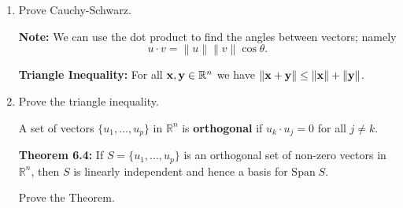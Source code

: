 \documentclass[12pt,letterpaper]{article}
\newcommand{\norm}[1]{\left\lVert#1\right\rVert}
\begin{document}
\begin{enumerate}

\Problem Prove the Theorem.

\vfill

\begin{defn} The set $$W^{\perp} =\{ z \in \mathbb{R}^n: z \cdot w=0 \text{ for all } w \in W\}$$ is called the {\bf orthogonal complement} of $W$.
\end{defn}

\newpage

{\bf Note:} $x \in W^{\perp}$ if and only if $x$ is orthogonal to each vector in a set that spans $W$. Also $W^{\perp}$ is a subspace of $\mathbb{R}^n$.

\vfill

{\bf Theorem 6.3} Let $A$ be an $m\times n$ matrix, then $$(\text{Row}(A))^{\perp} = \text{Null}(A) \text{ and } (\text{Col}(A))^{\perp}= \text{Null}(A^{T}).$$

\Problem Prove the Theorem.

\vfill

{\bf Cauchy-Schwarz Inequality:} For all ${\bf x}, {\bf y} \in {\mathbb R}^n$ we have
$$ |{\bf x} \cdot {\bf y}| \le \|{\bf x}\| \ \|{\bf y}\|. $$

\item Prove Cauchy-Schwarz.

\vfill

{\bf Note:} We can use the dot product to find the angles between vectors; namely $$u\cdot v = \norm{u} \norm{v} \cos \theta.$$

{\bf Triangle Inequality:} For all ${\bf x}, {\bf y} \in {\mathbb R}^n$  we have $\|{\bf x}+{\bf y}\| \le \|{\bf x}\| + \|{\bf y} \| $.

\item Prove the triangle inequality.

\vfill

\newpage

\begin{defn}
	A set of vectors $\{ u_1, \dots, u_p\}$ in $\mathbb{R}^n$ is {\bf orthogonal} if $u_k \cdot u_j=0$ for all $j\neq k$.
\end{defn}

{\bf Theorem 6.4:} If $S=\{ u_1, \dots, u_p\}$ is an orthogonal set of non-zero vectors in $\mathbb{R}^n$, then $S$ is linearly independent and hence a basis for $\text{Span} \; S$.

\Problem Prove the Theorem.

\vfill


\end{enumerate}
\end{document}
